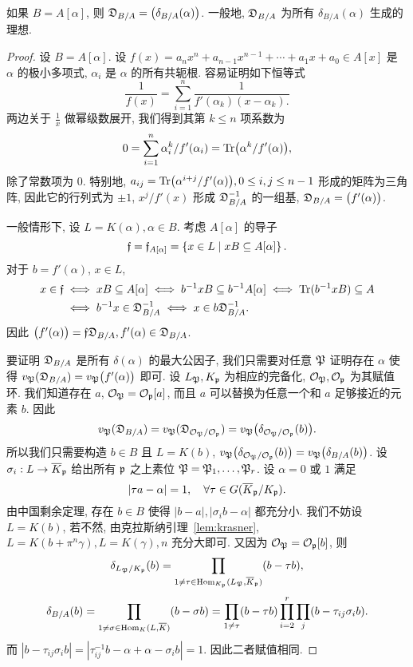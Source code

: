 \begin{theorem}{}{}
如果 $B=A[\alpha]$, 则 ${\mathfrak{D}}_{B/A}=\bigl(\delta_{B/A}(\alpha)\bigr)$. 一般地, ${\mathfrak{D}}_{B/A}$ 为所有 $\delta_{B/A}(\alpha)$ 生成的理想.
\end{theorem}
\begin{proof}
设 $B=A[\alpha]$.
设 $f(x)=a_nx^n+a_{n-1}x^{n-1}+\cdots+a_1x+a_0\in A[x]$ 是 $\alpha$ 的极小多项式, $\alpha_i$ 是 $\alpha$ 的所有共轭根. 容易证明如下恒等式
  \[\frac{1}{f(x)}=\sum_{i=1}^n \frac{1}{f'(\alpha_k)(x-\alpha_k).}\]
两边关于 $\frac{1}{x}$ 做幂级数展开, 我们得到其第 $k\le n$ 项系数为
  \[0=\sum_{i=1}^n \alpha_i^k/f'(\alpha_i)={\mathrm{Tr}}\bigl(\alpha^k/f'(\alpha)\bigr),\]
除了常数项为 $0$. 特别地, $a_{ij}={\mathrm{Tr}}\bigl(\alpha^{i+j}/f'(\alpha)\bigr),0\le i,j\le n-1$ 形成的矩阵为三角阵, 因此它的行列式为 $\pm 1$, $x^j/f'(x)$ 形成 ${\mathfrak{D}}_{B/A}^{-1}$ 的一组基, ${\mathfrak{D}}_{B/A}=\bigl(f'(\alpha)\bigr)$.

一般情形下, 设 $L=K(\alpha),\alpha\in B$. 考虑 $A[\alpha]$ 的导子
  \[{\mathfrak{f}}={\mathfrak{f}}_{A[\alpha]}=\left\{x\in L\mid x B\subseteq A[\alpha]\right\}.\]
对于 $b=f'(\alpha)$, $x\in L$,
  \[\begin{split}
    x\in{\mathfrak{f}}&\iff xB\subseteq A[\alpha] \iff b^{-1}xB\subseteq b^{-1} A[\alpha] \iff {\mathrm{Tr}}(b^{-1}xB)\subseteq A\\
           &\iff b^{-1}x\in{\mathfrak{D}}_{B/A}^{-1}\iff x\in b{\mathfrak{D}}_{B/A}^{-1}.
  \end{split}\]
因此 $\bigl(f'(\alpha)\bigr)={\mathfrak{f}} {\mathfrak{D}}_{B/A},f'(\alpha)\in{\mathfrak{D}}_{B/A}$.

要证明 ${\mathfrak{D}}_{B/A}$ 是所有 $\delta(\alpha)$ 的最大公因子, 我们只需要对任意 ${\mathfrak{P}}$ 证明存在 $\alpha$ 使得 $v_{\mathfrak{P}}({\mathfrak{D}}_{B/A})=v_{{\mathfrak{P}}}\bigl(f'(\alpha)\bigr)$ 即可. 设 $L_{\mathfrak{P}},K_{\mathfrak{p}}$ 为相应的完备化, ${\mathcal{O}}_{\mathfrak{P}},{\mathcal{O}}_{\mathfrak{p}}$ 为其赋值环. 我们知道存在 $a$, ${\mathcal{O}}_{\mathfrak{P}}={\mathcal{O}}_{\mathfrak{p}}[a]$, 而且 $a$ 可以替换为任意一个和 $a$ 足够接近的元素 $b$. 因此
  \[v_{\mathfrak{P}}({\mathfrak{D}}_{B/A})=v_{\mathfrak{P}}({\mathfrak{D}}_{{\mathcal{O}}_{\mathfrak{P}}/{\mathcal{O}}_{\mathfrak{p}}})=v_{\mathfrak{P}}\bigl(\delta_{{\mathcal{O}}_{\mathfrak{P}}/{\mathcal{O}}_{\mathfrak{p}}}(b)\bigr).\]
所以我们只需要构造 $b\in B$ 且 $L=K(b)$, $v_{\mathfrak{P}}\bigl(\delta_{{\mathcal{O}}_{\mathfrak{P}}/{\mathcal{O}}_{\mathfrak{p}}}(b)\bigr)=v_{\mathfrak{P}}\bigl(\delta_{B/A}(b)\bigr)$. 
设 $\sigma_i:L\to \overline K_{\mathfrak{p}}$ 给出所有 ${\mathfrak{p}}$ 之上素位 ${\mathfrak{P}}={\mathfrak{P}}_1,\dots,{\mathfrak{P}}_r$. 设 $\alpha=0$ 或 $1$ 满足
  \[|\tau a-\alpha|=1,\quad\forall \tau\in G(\overline K_{\mathfrak{p}}/K_{\mathfrak{p}}).\]
由中国剩余定理, 存在 $b\in B$ 使得 $|b-a|,|\sigma_i b-\alpha|$ 都充分小. 我们不妨设 $L=K(b)$, 若不然, 由克拉斯纳引理~\ref{lem:krasner}, $L=K(b+\pi^n \gamma),L=K(\gamma), n$ 充分大即可. 又因为 ${\mathcal{O}}_{\mathfrak{P}}={\mathcal{O}}_{\mathfrak{p}}[b]$, 则
  \[\delta_{L_{\mathfrak{P}}/K_{\mathfrak{p}}}(b)=\prod_{1\neq\tau\in {\mathrm{Hom}}_{K_{\mathfrak{p}}}(L_{\mathfrak{P}},\overline K_{\mathfrak{p}})}(b-\tau b),\]
  \[\delta_{B/A}(b)=\prod_{1\neq \sigma\in {\mathrm{Hom}}_K(L,\overline K)}(b-\sigma b)=\prod_{1\neq \tau}(b-\tau b)\prod_{i=2}^r \prod_j (b-\tau_{ij}\sigma_i b).\]
而 $|b-\tau_{ij}\sigma_i b|=|\tau_{ij}^{-1} b-\alpha+\alpha-\sigma_i b|=1$. 因此二者赋值相同.
\end{proof}

